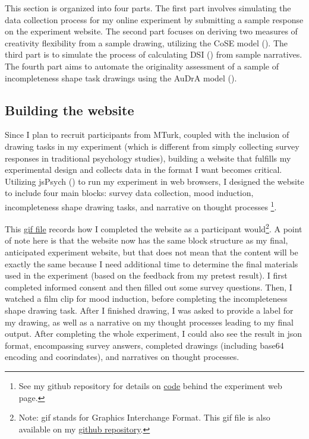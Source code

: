 \documentclass[../Proposal.tex]{subfiles}
\begin{document}
This section is organized into four parts. The first part involves simulating the data collection process for my online experiment by submitting a sample response on the experiment website. The second part focuses on deriving two measures of creativity flexibility from a sample drawing, utilizing the CoSE model (\cite{aksan_cose_2021}). The third part is to simulate the process of calculating DSI (\cite{johnson_divergent_2022}) from sample narratives. The fourth part aims to automate the originality assessment of a sample of incompleteness shape task drawings using the AuDrA model (\cite{patterson_audra_2023}). 

\subsection*{Building the website}
Since I plan to recruit participants from MTurk, coupled with the inclusion of drawing tasks in my experiment (which is different from simply collecting survey responses in traditional psychology studies), building a website that fulfills my experimental design and collects data in the format I want becomes critical. Utilizing jsPsych (\cite{leeuw_jspsych_2023}) to run my experiment in web browsers, I designed the website to include four main blocks: survey data collection, mood induction, incompleteness shape drawing tasks, and narrative on thought processes \footnote{See my github repository for details on \href{https://github.com/cty20010831/UChicago_MA_Thesis_Experiment/tree/2f247cb6d22f7f9d4c528c13bb9ed550fb8a4807}{code} behind the experiment web page.}.

This \href{https://www.kapwing.com/c/miV2nCSXYV}{gif file} records how I completed the website as a participant would\footnote{Note: gif stands for Graphics Interchange Format. This gif file is also available on my \href{https://github.com/UC-MACS-30200/course-project-cty20010831/blob/main/sample_website_response_gif/sample_response.gif}{github repository}.}. A point of note here is that the website now has the same block structure as my final, anticipated experiment website, but that does not mean that the content will be exactly the same because I need additional time to determine the final materials used in the experiment (based on the feedback from my pretest result). I first completed informed consent and then filled out some survey questions. Then, I watched a film clip for mood induction, before completing the incompleteness shape drawing task. After I finished drawing, I was asked to provide a label for my drawing, as well as a narrative on my thought processes leading to my final output. After completing the whole experiment, I could also see the result in json format, encompassing survey answers, completed drawings (including base64 encoding and coorindates), and narratives on thought processes.
\end{document}
